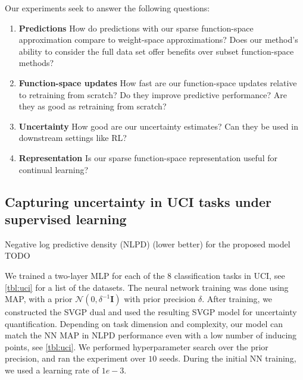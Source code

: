 \documentclass{article}
\newlength{\tblw}
\newcommand{\mbf}[1]{\mathbf{#1}}
\newcommand{\MI}{\mbf{I}}
\begin{document}
Our experiments seek to answer the following questions:
\begin{enumerate}
  \item \textbf{Predictions} How do predictions with our sparse function-space approximation compare to weight-space approximations? Does our method's ability to consider the full data set offer benefits over subset function-space methods?
  \item \textbf{Function-space updates} How fast are our function-space updates relative to retraining from scratch? Do they improve predictive performance? Are they as good as retraining from scratch?
  \item \textbf{Uncertainty} How good are our uncertainty estimates? Can they be used in downstream settings like RL?
  \item \textbf{Representation} Is our sparse function-space representation useful for continual learning?
\end{enumerate}

\subsection{Capturing uncertainty in UCI tasks under supervised learning}
%


\begin{table}[t!] 
  \centering\scriptsize
  \caption{Negative log predictive density (NLPD) (lower better) for the proposed model TODO} 
	\label{tbl:uci}
	\renewcommand{\arraystretch}{1.}
	\setlength{\tabcolsep}{2pt}
	\setlength{\tblw}{0.14\textwidth}  
	
	\newcommand{\val}[2]{%
		$#1$\textcolor{gray}{\tiny ${\pm}#2$}
	} 

	
\end{table}
We trained a two-layer MLP for each of the $8$ classification tasks in UCI, see \cref{tbl:uci} for a list of the datasets. The neural network training was done using MAP, with a prior $\mathcal{N}(0,\delta^{-1} \MI)$ with prior precision $\delta$. After training, we constructed the SVGP dual and used the resulting SVGP model for uncertainty quantification. Depending on task dimension and complexity, our model can match the NN MAP in NLPD performance even with a low number of inducing points, see \cref{tbl:uci}. We performed hyperparameter search over the prior precision, and ran the experiment over $10$ seeds. During the initial NN training, we used a learning rate of $1e-3$.
\end{document}
